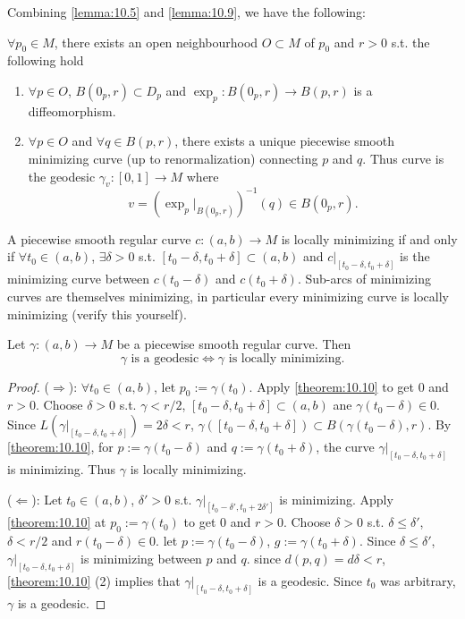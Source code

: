 Combining \autoref{lemma:10.5} and \autoref{lemma:10.9}, we have the following:

\begin{theorem}\label{theorem:10.10}
$\forall p_0 \in M$, there exists an open neighbourhood $O \subset M$ of $p_0$ and $r >0$ s.t. the following hold
\begin{enumerate}[label=(\arabic*)]
\item $\forall p \in O$, $B(0_p,r) \subset D_p$ and $\exp_p:B(0_p,r)\to B(p,r)$ is a diffeomorphism.
\item $\forall p \in O$ and $\forall q \in B(p,r)$, there exists a unique piecewise smooth minimizing curve
(up to renormalization) connecting $p$ and $q$. Thus curve is the geodesic $\gamma_v:[0,1]\to M$ where
\[
v = (\exp_p|_{B(0_p,r)})^{-1}(q) \in B(0_p,r).
\]
\end{enumerate}
\end{theorem}
A piecewise smooth regular curve $c : (a,b) \to M$ is locally minimizing if and only if $\forall t_0 \in (a,b)$,
$\exists \delta > 0$ s.t. $[t_0 - \delta, t_0 + \delta] \subset (a,b)$ and $c|_{[t_0 - \delta, t_0 + \delta]}$
is the minimizing curve between $c(t_0 - \delta)$ and $c(t_0 + \delta)$.
Sub-arcs of minimizing curves are themselves minimizing, in particular every minimizing curve is locally minimizing (verify this yourself).

\begin{theorem}\label{theorem:10.11}
Let $\gamma:(a,b) \to M$ be a piecewise smooth regular curve. Then
\[
\gamma \text{ is a geodesic} \Leftrightarrow \gamma \text{ is locally minimizing}.
\]
\end{theorem}

\begin{proof}
($\Rightarrow$): $\forall t_0 \in (a,b)$, let $p_0:=\gamma(t_0)$. Apply \autoref{theorem:10.10} to get $0$ and $r>0$.
Choose $\delta >0$ s.t. $\gamma < r/2$, $[t_0-\delta,t_0+\delta]\subset(a,b)$ ane $\gamma(t_0-\delta) \in 0$.
Since $L(\gamma|_{[t_0-\delta,t_0+\delta]})=2\delta < r$, $\gamma([t_0-\delta,t_0+\delta])\subset B(\gamma(t_0-\delta),r)$.
By \autoref{theorem:10.10}, for $p:=\gamma(t_0-\delta)$ and $q := \gamma(t_0+\delta)$, the curve $\gamma|_{[t_0-\delta,t_0+\delta]}$ is minimizing.
Thus $\gamma$ is locally minimizing.

($\Leftarrow$): Let $t_0 \in (a,b)$, $\delta' >0$ s.t. $\gamma|_{[t_0-\delta',t_0+2\delta']}$ is minimizing.
Apply \autoref{theorem:10.10} at $p_0 := \gamma(t_0)$ to get $0$ and $r>0$.
Choose $\delta >0$ s.t. $\delta \leq \delta'$, $\delta < r/2$ and $r(t_0 - \delta) \in 0$.
let $p:= \gamma(t_0 - \delta)$, $g := \gamma(t_0 + \delta)$. Since $\delta \leq \delta'$,
$\gamma|_{[t_0-\delta,t_0+\delta]}$ is minimizing between $p$ and $q$. since $d(p,q) = d\delta <r$, \autoref{theorem:10.10} (2) implies that
$\gamma|_{[t_0-\delta,t_0+\delta]}$ is a geodesic.
Since $t_0$ was arbitrary, $\gamma$ is a geodesic.
\end{proof}

